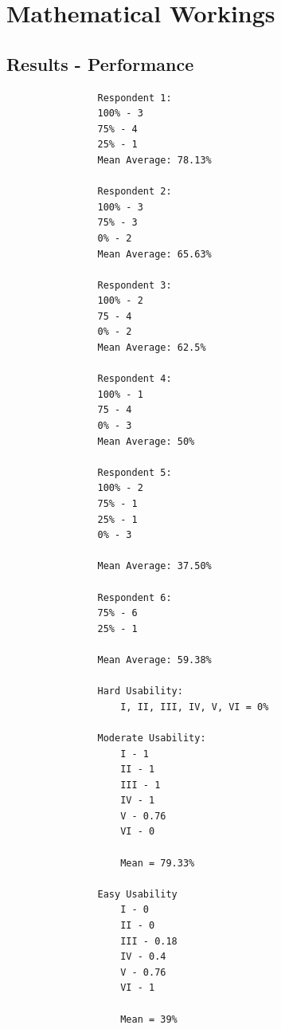 \documentclass[12pt]{report} %
\begin{document}
	\chapter{Mathematical Workings}
		\section*{Results - Performance}
			\begin{lstlisting}
				Respondent 1:
				100% - 3
				75% - 4
				25% - 1
				Mean Average: 78.13%

				Respondent 2: 
				100% - 3
				75% - 3
				0% - 2
				Mean Average: 65.63%

				Respondent 3:
				100% - 2
				75 - 4
				0% - 2
				Mean Average: 62.5%

				Respondent 4:
				100% - 1
				75 - 4
				0% - 3
				Mean Average: 50%

				Respondent 5:
				100% - 2
				75% - 1
				25% - 1
				0% - 3

				Mean Average: 37.50%

				Respondent 6:
				75% - 6
				25% - 1

				Mean Average: 59.38%

				Hard Usability:
					I, II, III, IV, V, VI = 0%

				Moderate Usability:
					I - 1
					II - 1
					III - 1
					IV - 1
					V - 0.76
					VI - 0

					Mean = 79.33%

				Easy Usability
					I - 0
					II - 0
					III - 0.18
					IV - 0.4
					V - 0.76
					VI - 1

					Mean = 39%
			\end{lstlisting}
\end{document}
